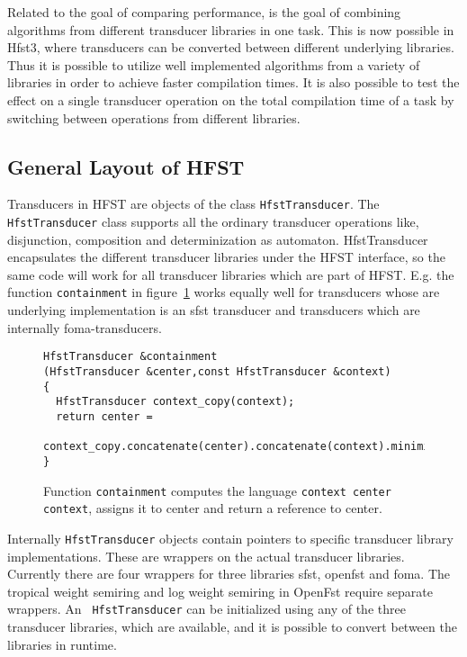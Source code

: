 \documentclass{llncs}
\begin{document}
Related to the goal of comparing performance, is the goal of combining
algorithms from different transducer libraries in one task. This is
now possible in Hfst3, where transducers can be converted between
different underlying libraries. Thus it is possible to utilize well
implemented algorithms from a variety of libraries in order to achieve
faster compilation times. It is also possible to test the effect on a
single transducer operation on the total compilation time of a task by
switching between operations from different libraries.

\subsection{General Layout of HFST}

Transducers in HFST are objects of the class {\tt HfstTransducer}. The
{\tt HfstTransducer} class supports all the ordinary transducer
operations like, disjunction, composition and determinization as
automaton. HfstTransducer encapsulates the different transducer
libraries under the HFST interface, so the same code will work for all
transducer libraries which are part of HFST. E.g. the function {\tt containment} in figure~\ref{containment-figure} works equally well for transducers whose are underlying implementation is an sfst transducer and transducers which are internally foma-transducers.

\begin{figure}
\begin{center}
\caption{Function {\tt containment} computes the language {\tt context center context}, assigns it to center and return a reference to center.}\label{containment-figure}
\begin{verbatim}
HfstTransducer &containment
(HfstTransducer &center,const HfstTransducer &context)
{
  HfstTransducer context_copy(context);
  return center = 
    context_copy.concatenate(center).concatenate(context).minimize();
}
\end{verbatim}
\end{center}
\end{figure}

Internally {\tt HfstTransducer} objects contain pointers to specific
transducer library implementations. These are wrappers on the actual
transducer libraries. Currently there are four wrappers for three
libraries sfst, openfst and foma. The tropical weight semiring and log
weight semiring in OpenFst require separate wrappers. An {\tt
  HfstTransducer} can be initialized using any of the three transducer
libraries, which are available, and it is possible to convert between
the libraries in runtime.
\end{document}
